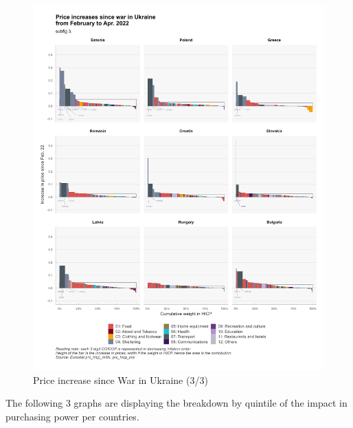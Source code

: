 \documentclass[
  9pt,
  a4paper,
  DIV=11,
  numbers=noendperiod,
  oneside]{scrartcl}
\begin{document}
\begin{figure}

\caption{Price increase since War in Ukraine (3/3)}

{\centering \includegraphics[width=16cm,height=\textheight]{../svg/depuis_wiu_3.png}

}

\end{figure}

\FloatBarrier

The following 3 graphs are displaying the breakdown by quintile of the
impact in purchasing power per countries.
\end{document}
